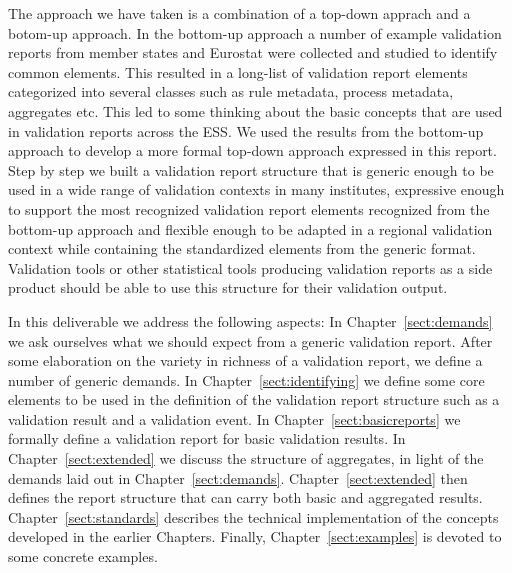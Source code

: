 The approach we have taken is a combination of a top-down apprach and a
botom-up approach.  In the bottom-up approach a number of example validation
reports from member states and Eurostat were collected and studied to identify
common elements.  This resulted in a long-list of validation report elements
categorized into several classes such as rule metadata, process metadata,
aggregates etc.  This led to some thinking about the basic concepts that are
used in validation reports across the ESS.  We used the results from the
bottom-up approach to develop a more formal top-down approach expressed in this
report.  Step by step we built a validation report structure that is generic
enough to be used in a wide range of validation contexts in many institutes,
expressive enough to support the most recognized validation report elements
recognized from the bottom-up approach and flexible enough to be adapted in a
regional validation context while containing the standardized elements from the
generic format.  Validation tools or other statistical tools producing
validation reports as a side product should be able to use this structure for
their validation output.

In this deliverable we address the following aspects: In
Chapter~\ref{sect:demands} we ask ourselves what we should expect from a
generic validation report.  After some elaboration on the variety in richness
of a validation report, we define a number of generic demands.  In
Chapter~\ref{sect:identifying} we define some core elements to be used in the
definition of the validation report structure such as a validation result and a
validation event.  In Chapter~\ref{sect:basicreports} we formally define a
validation report for basic validation results. In Chapter~\ref{sect:extended}
we discuss the structure of aggregates, in light of the demands laid out in
Chapter~\ref{sect:demands}. Chapter~\ref{sect:extended} then defines the report
structure that can carry both basic and aggregated results.
Chapter~\ref{sect:standards} describes the technical implementation of the
concepts developed in the earlier Chapters.  Finally,
Chapter~\ref{sect:examples} is devoted to some concrete examples.


